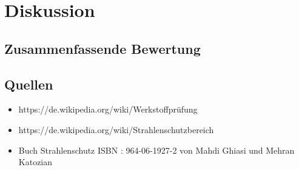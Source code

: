 \chapter{Diskussion}
\label{sec:diskussion}

\section{Zusammenfassende Bewertung}
\label{sec:überschrift}

\section{Quellen}
\label{sec:quellen}
\begin{itemize}
\item https://de.wikipedia.org/wiki/Werkstoffprüfung
\item https://de.wikipedia.org/wiki/Strahlenschutzbereich
\item Buch Strahlenschutz ISBN : 964-06-1927-2 von Mahdi Ghiasi und Mehran Katozian
\end{itemize}

